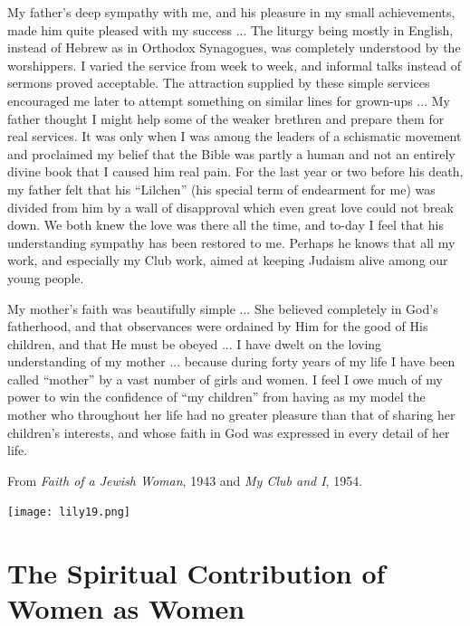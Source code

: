 \documentclass[14pt, article, extrafontsizes, twopage, a4paper]{memoir}
\newcommand{\attr}[1]{
  {\raggedleft\smaller#1

  }
}
\begin{document}
My father’s deep sympathy with me, and his pleasure
in my small achievements, made him quite pleased with
my success ... The
liturgy being mostly in English, instead of Hebrew as in
Orthodox Synagogues, was completely understood by the
worshippers. I varied the service from week to week, and
informal talks instead of sermons proved acceptable. The
attraction supplied by these simple services encouraged
me later to attempt something on similar lines for grown-ups ...
My father thought I might help some
of the weaker brethren and prepare them for real services.
It was only when I was among the leaders of a
schismatic movement and proclaimed my belief that the
Bible was partly a human and not an entirely divine book
that I caused him real pain. For the last year or two
before his death, my father felt that his “Lilchen” (his
special term of endearment for me) was divided from
him by a wall of disapproval which even great love could
not break down. We both knew the love was there all the
time, and to-day I feel that his understanding sympathy
has been restored to me. Perhaps he knows that all my
work, and especially my Club work, aimed at keeping
Judaism alive among our young people.

My mother’s faith was beautifully simple ... She believed
completely in God’s fatherhood, and that observances
were ordained by Him for the good of His children, and
that He must be obeyed ... I have dwelt on the loving
understanding of my mother ... because during forty years of my life I
have been called “mother” by a vast number of girls
and women. I feel I owe much of my power to win the
confidence of “my children” from having as my model
the mother who throughout her life had no greater
pleasure than that of sharing her children’s interests, and
whose faith in God was expressed in every detail of her
life.

\attr{From \textsl{Faith of a Jewish Woman}, 1943 and \textsl{My Club and I}, 1954.}

{
  \centering
\vspace*{.5\baselineskip}
\texttt{[image: lily19.png]}\\

}

\clearpage
\chapter{The Spiritual Contribution of Women as Women}
\end{document}
